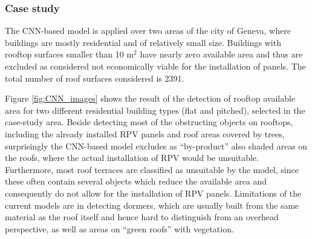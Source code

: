 \subsubsection{Case study}

The CNN-based model is applied over two areas of the city of Geneva, where buildings are mostly residential and of relatively small size. Buildings with rooftop surfaces smaller than 10 m$^2$ have nearly zero available area and thus are excluded as considered not economically viable for the installation of panels. The total number of roof surfaces considered is 2391.

Figure \ref{fig:CNN_images} shows the result of the detection of rooftop available area for two different residential building types (flat and pitched), selected in the case-study area. Beside detecting most of the obstructing objects on rooftops, including the already installed RPV panels and roof areas covered by trees, surprisingly the CNN-based model excludes as “by-product” also shaded areas on the roofs, where the actual installation of RPV would be unsuitable. Furthermore, most roof terraces are classified as unsuitable by the model, since these often contain several objects which reduce the available area and consequently do not allow for the installation of RPV panels. Limitations of the current models are in detecting dormers, which are usually built from the same material as the roof itself and hence hard to distinguish from an overhead perspective, as well as areas on “green roofs” with vegetation.

